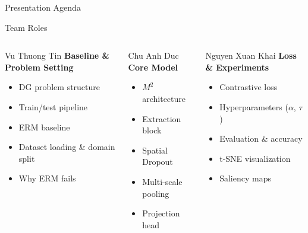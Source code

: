 \documentclass[t, aspectratio=169]{beamer} %
\subtitle{\Large{Multiscale and Multilayer Contrastive Learning for Domain Generalization}}
\author{\texorpdfstring{%
	\textbf{Group 26 members} \\[2pt]
	Vu Thuong Tin - 20230091 \\[1pt]
	Chu Anh Duc - 20230081 \\[1pt]
	Nguyen Xuan Khai - 20235508%
}{Group 26}}
\begin{document}
	\hustintropage{}
	\husttitlepage
	\resetPageCount
	\showPageNumber

	\useStyleHustFull
	\useThinBar
	\begin{frame}{Presentation Agenda}
		\tableofcontents
	\end{frame}

	\begin{frame}{Team Roles}
		\begin{columns}[T]
			\begin{column}{0.33\textwidth}
				\begin{block}{Vu Thuong Tin}
					\textbf{Baseline \& Problem Setting}
					\begin{itemize}
						\small
						\item DG problem structure
						\item Train/test pipeline
						\item ERM baseline
						\item Dataset loading \& domain split
						\item Why ERM fails
					\end{itemize}
				\end{block}
			\end{column}
			\begin{column}{0.33\textwidth}
				\begin{block}{Chu Anh Duc}
					\textbf{Core Model}
					\begin{itemize}
						\small
						\item $M^2$ architecture
						\item Extraction block
						\item Spatial Dropout
						\item Multi-scale pooling
						\item Projection head
					\end{itemize}
				\end{block}
			\end{column}
			\begin{column}{0.33\textwidth}
				\begin{block}{Nguyen Xuan Khai}
					\textbf{Loss \& Experiments}
					\begin{itemize}
						\small
						\item Contrastive loss
						\item Hyperparameters ($\alpha$, $\tau$)
						\item Evaluation \& accuracy
						\item t-SNE visualization
						\item Saliency maps
					\end{itemize}
				\end{block}
			\end{column}
		\end{columns}
	\end{frame}
\end{document}
